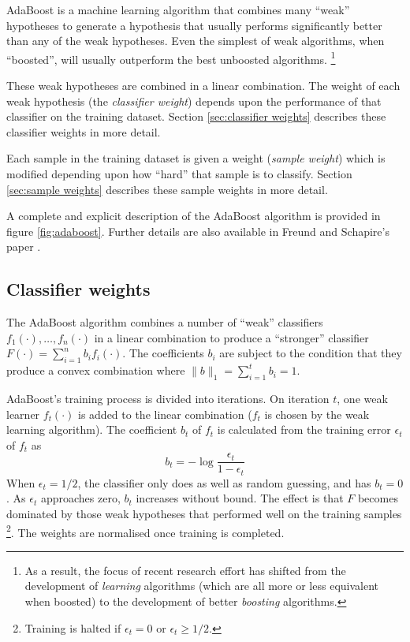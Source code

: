 AdaBoost is a machine learning algorithm
that combines many ``weak'' hypotheses to generate a hypothesis 
that usually performs significantly better than any of the weak
hypotheses.  Even the simplest of weak algorithms, when
``boosted'', will usually outperform the best unboosted algorithms.
\footnote{As a result, the focus of recent research effort has shifted from the
development of \emph{learning} algorithms (which are all more
or less equivalent when boosted) to the development of better \emph{boosting}
algorithms.}

These weak hypotheses are combined in a linear combination.
The weight of each weak hypothesis (the
\emph{classifier weight}) depends upon the performance of that
classifier on the training dataset.  Section \ref{sec:classifier
weights} describes these classifier weights in more detail.

Each sample in the training dataset is given a weight (\emph{sample
weight}) which is modified depending upon how ``hard'' that
sample is to classify.  Section \ref{sec:sample weights} describes
these sample weights in more detail.

A complete and explicit description of the AdaBoost algorithm is
provided in figure \ref{fig:adaboost}.  Further details are also
available in Freund and Schapire's paper \cite{Freund96}.


\subsection{Classifier weights}
\label{sec:classifier weights}

The AdaBoost algorithm combines a number of ``weak'' classifiers
$f_1(\cdot), \ldots, f_n(\cdot)$ in a linear combination to produce a
``stronger'' classifier $F(\cdot) = \sum_{i=1}^{n} b_i f_i(\cdot)$.
The coefficients $b_i$ are subject to the condition that they produce a
convex combination where $\|b\|_1 = \sum_{i=1}^{t} b_i = 1$.

AdaBoost's training process is divided into iterations.  On iteration
$t$, one weak learner $f_t(\cdot)$ is added to the linear
combination ($f_t$ is chosen by the weak learning algorithm).  The
coefficient $b_t$ of $f_t$ is calculated from the 
training error $\epsilon_t$ of $f_t$ as 
%
\begin{equation}
b_t = - \log \frac{\epsilon_t}{1 - \epsilon_t}
\label{eqn:theory:bt}
\end{equation}
%
When $\epsilon_t = 1/2$, the classifier only does as
well as random guessing, and has $b_t = 0$.  As
$\epsilon_t$ approaches zero, $b_t$ increases without bound.  The
effect is that $F$ becomes dominated by those weak hypotheses that
performed well on the training samples
\footnote{Training is halted if $\epsilon_t = 0$ or $\epsilon_t \geq 1/2$.}.  The weights are normalised once training is completed.


